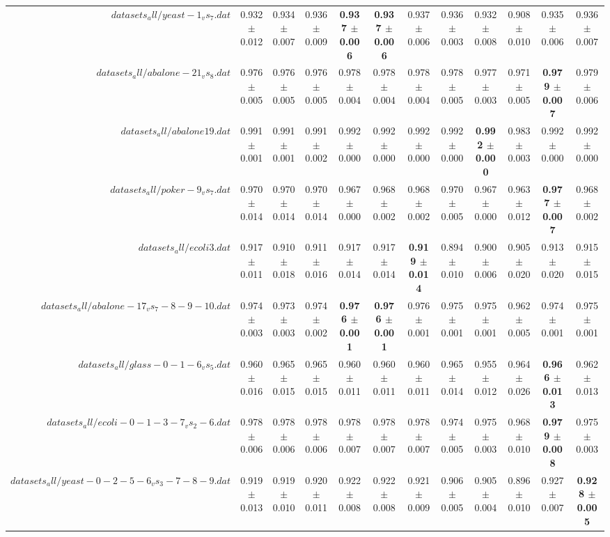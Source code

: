 \begin{table}[!ht]
{\begin{tabular}{r c c c c c c c c c c c}
$datasets_all/yeast-1_vs_7.dat$ & 0.932 $\pm$ 0.012 & 0.934 $\pm$ 0.007 & 0.936 $\pm$ 0.009 & \textbf{0.937 $\pm$ 0.006} & \textbf{0.937 $\pm$ 0.006} & 0.937 $\pm$ 0.006 & 0.936 $\pm$ 0.003 & 0.932 $\pm$ 0.008 & 0.908 $\pm$ 0.010 & 0.935 $\pm$ 0.006 & 0.936 $\pm$ 0.007 \\
$datasets_all/abalone-21_vs_8.dat$ & 0.976 $\pm$ 0.005 & 0.976 $\pm$ 0.005 & 0.976 $\pm$ 0.005 & 0.978 $\pm$ 0.004 & 0.978 $\pm$ 0.004 & 0.978 $\pm$ 0.004 & 0.978 $\pm$ 0.005 & 0.977 $\pm$ 0.003 & 0.971 $\pm$ 0.005 & \textbf{0.979 $\pm$ 0.007} & 0.979 $\pm$ 0.006 \\
$datasets_all/abalone19.dat$ & 0.991 $\pm$ 0.001 & 0.991 $\pm$ 0.001 & 0.991 $\pm$ 0.002 & 0.992 $\pm$ 0.000 & 0.992 $\pm$ 0.000 & 0.992 $\pm$ 0.000 & 0.992 $\pm$ 0.000 & \textbf{0.992 $\pm$ 0.000} & 0.983 $\pm$ 0.003 & 0.992 $\pm$ 0.000 & 0.992 $\pm$ 0.000 \\
$datasets_all/poker-9_vs_7.dat$ & 0.970 $\pm$ 0.014 & 0.970 $\pm$ 0.014 & 0.970 $\pm$ 0.014 & 0.967 $\pm$ 0.000 & 0.968 $\pm$ 0.002 & 0.968 $\pm$ 0.002 & 0.970 $\pm$ 0.005 & 0.967 $\pm$ 0.000 & 0.963 $\pm$ 0.012 & \textbf{0.977 $\pm$ 0.007} & 0.968 $\pm$ 0.002 \\
$datasets_all/ecoli3.dat$ & 0.917 $\pm$ 0.011 & 0.910 $\pm$ 0.018 & 0.911 $\pm$ 0.016 & 0.917 $\pm$ 0.014 & 0.917 $\pm$ 0.014 & \textbf{0.919 $\pm$ 0.014} & 0.894 $\pm$ 0.010 & 0.900 $\pm$ 0.006 & 0.905 $\pm$ 0.020 & 0.913 $\pm$ 0.020 & 0.915 $\pm$ 0.015 \\
$datasets_all/abalone-17_vs_7-8-9-10.dat$ & 0.974 $\pm$ 0.003 & 0.973 $\pm$ 0.003 & 0.974 $\pm$ 0.002 & \textbf{0.976 $\pm$ 0.001} & \textbf{0.976 $\pm$ 0.001} & 0.976 $\pm$ 0.001 & 0.975 $\pm$ 0.001 & 0.975 $\pm$ 0.001 & 0.962 $\pm$ 0.005 & 0.974 $\pm$ 0.001 & 0.975 $\pm$ 0.001 \\
$datasets_all/glass-0-1-6_vs_5.dat$ & 0.960 $\pm$ 0.016 & 0.965 $\pm$ 0.015 & 0.965 $\pm$ 0.015 & 0.960 $\pm$ 0.011 & 0.960 $\pm$ 0.011 & 0.960 $\pm$ 0.011 & 0.965 $\pm$ 0.014 & 0.955 $\pm$ 0.012 & 0.964 $\pm$ 0.026 & \textbf{0.966 $\pm$ 0.013} & 0.962 $\pm$ 0.013 \\
$datasets_all/ecoli-0-1-3-7_vs_2-6.dat$ & 0.978 $\pm$ 0.006 & 0.978 $\pm$ 0.006 & 0.978 $\pm$ 0.006 & 0.978 $\pm$ 0.007 & 0.978 $\pm$ 0.007 & 0.978 $\pm$ 0.007 & 0.974 $\pm$ 0.005 & 0.975 $\pm$ 0.003 & 0.968 $\pm$ 0.010 & \textbf{0.979 $\pm$ 0.008} & 0.975 $\pm$ 0.003 \\
$datasets_all/yeast-0-2-5-6_vs_3-7-8-9.dat$ & 0.919 $\pm$ 0.013 & 0.919 $\pm$ 0.010 & 0.920 $\pm$ 0.011 & 0.922 $\pm$ 0.008 & 0.922 $\pm$ 0.008 & 0.921 $\pm$ 0.009 & 0.906 $\pm$ 0.005 & 0.905 $\pm$ 0.004 & 0.896 $\pm$ 0.010 & 0.927 $\pm$ 0.007 & \textbf{0.928 $\pm$ 0.005} \\

\end{tabular}}
\end{table}
